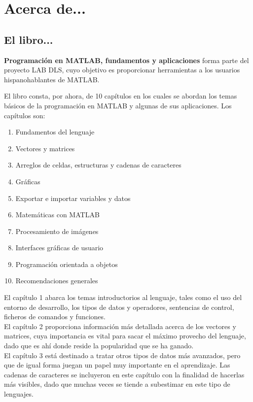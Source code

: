 \chapter*{Acerca de...}

\section*{El libro...}

\textbf{Programación en MATLAB, fundamentos y aplicaciones} forma parte del proyecto LAB DLS, cuyo objetivo es
proporcionar herramientas a los usuarios hispanohablantes de MATLAB. %

El libro consta, por ahora, de 10 capítulos en los cuales se abordan los temas básicos de la programación
en MATLAB y algunas de sus aplicaciones. Los capítulos son:\\

\begin{enumerate}
\item Fundamentos del lenguaje
\item Vectores y matrices
\item Arreglos de celdas, estructuras y cadenas de caracteres
\item Gráficas
\item Exportar e importar variables y datos
\item Matemáticas con MATLAB
\item Procesamiento de imágenes
\item Interfaces gráficas de usuario
\item Programación orientada a objetos
\item Recomendaciones generales
\end{enumerate}

El capítulo 1 abarca los temas introductorios al lenguaje, tales como el uso del entorno de desarrollo, los tipos
de datos y operadores, sentencias de control, ficheros de comandos y funciones.\\

El capítulo 2 proporciona información más detallada acerca de los vectores y matrices, cuya importancia es vital 
para sacar el máximo provecho del lenguaje, dado que es ahí donde reside la popularidad que se ha ganado.\\

El capítulo 3 está destinado a tratar otros tipos de datos más avanzados, pero que de igual forma juegan un
papel muy importante en el aprendizaje. Las cadenas de caracteres se incluyeron en este capítulo con la finalidad
de hacerlas más visibles, dado que muchas veces se tiende a subestimar en este tipo de lenguajes.\\

